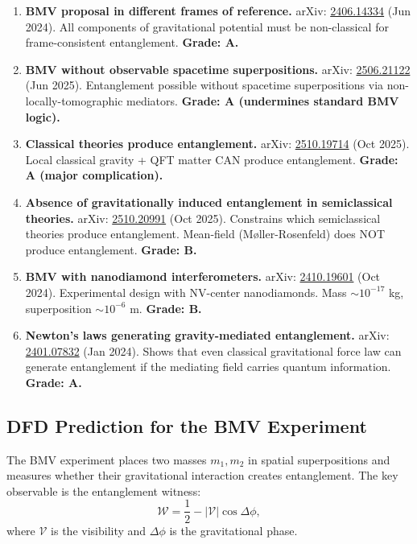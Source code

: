 \documentclass[11pt,a4paper]{article}
\begin{document}
\begin{enumerate}
\item \textbf{BMV proposal in different frames of reference.} arXiv: \href{https://arxiv.org/abs/2406.14334}{2406.14334} (Jun 2024). All components of gravitational potential must be non-classical for frame-consistent entanglement. \textbf{Grade: A.}

\item \textbf{BMV without observable spacetime superpositions.} arXiv: \href{https://arxiv.org/abs/2506.21122}{2506.21122} (Jun 2025). Entanglement possible without spacetime superpositions via non-locally-tomographic mediators. \textbf{Grade: A (undermines standard BMV logic).}

\item \textbf{Classical theories produce entanglement.} arXiv: \href{https://arxiv.org/abs/2510.19714}{2510.19714} (Oct 2025). Local classical gravity + QFT matter CAN produce entanglement. \textbf{Grade: A (major complication).}

\item \textbf{Absence of gravitationally induced entanglement in semiclassical theories.} arXiv: \href{https://arxiv.org/abs/2510.20991}{2510.20991} (Oct 2025). Constrains which semiclassical theories produce entanglement. Mean-field (M\o ller-Rosenfeld) does NOT produce entanglement. \textbf{Grade: B.}

\item \textbf{BMV with nanodiamond interferometers.} arXiv: \href{https://arxiv.org/abs/2410.19601}{2410.19601} (Oct 2024). Experimental design with NV-center nanodiamonds. Mass $\sim 10^{-17}$ kg, superposition $\sim 10^{-6}$ m. \textbf{Grade: B.}

\item \textbf{Newton's laws generating gravity-mediated entanglement.} arXiv: \href{https://arxiv.org/abs/2401.07832}{2401.07832} (Jan 2024). Shows that even classical gravitational force law can generate entanglement if the mediating field carries quantum information. \textbf{Grade: A.}
\end{enumerate}

\subsection{DFD Prediction for the BMV Experiment}
\label{sec:DFD-BMV}

The BMV experiment places two masses $m_1, m_2$ in spatial superpositions and measures whether their gravitational interaction creates entanglement. The key observable is the entanglement witness:
\begin{equation}
\mathcal{W} = \frac{1}{2} - |\mathcal{V}|\cos\Delta\phi,
\end{equation}
where $\mathcal{V}$ is the visibility and $\Delta\phi$ is the gravitational phase.
\end{document}
